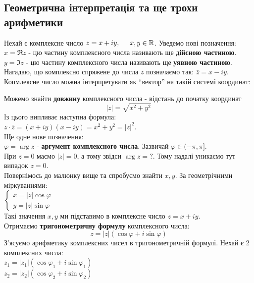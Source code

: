 \documentclass[a4paper, 10pt]{article}
\theoremstyle{theoremdd}
\theoremstyle{theoremdd}
\theoremstyle{theoremdd}
\theoremstyle{theoremdd}
\theoremstyle{theoremdd}
\theoremstyle{theoremdd}
\theoremstyle{theoremdd}
\theoremstyle{theoremdd}
\begin{document}
\subsection{Геометрична інтерпретація та ще трохи арифметики}
Нехай є комплексне число $z = x + iy, \hspace{0.5cm} x,y \in \mathbb{R}$. Уведемо нові позначення:\\
$x = \Re z$ - цю частину комплексного числа називають ще \textbf{дійсною частиною}. \\
$y = \Im z$ - цю частину комплексного числа називають ще \textbf{уявною частиною}.\\
Нагадаю, що комплексно спряжене до числа $z$ позначаємо так: $\bar{z} = x - iy$.
\bigskip \\
Копмлексне число можна інтерпретувати як \enquote{вектор} на такій системі координат:
\begin{figure}[H]
\centering
{}
\end{figure}
Можемо знайти \textbf{довжину} комплексного числа - відстань до початку координат
$$|z| = \sqrt{x^2+y^2}$$
Із цього випливає наступна формула:\\
$z \cdot \bar{z} = (x+iy)(x-iy) = x^2+y^2 = |z|^2$.
\bigskip \\
Ще одне нове позначення:\\
$\varphi = \arg z$ - \textbf{аргумент комплексного числа}. Зазвичай $\varphi \in (-\pi,\pi]$.
\bigskip \\
При $z = 0$ маємо $|z| = 0$, а тому звідси $\arg z = ?$. Тому надалі уникаємо тут випадок $z = 0$.
\bigskip \\
Повернімось до малюнку вище та спробуємо знайти $x,y$. За геометрічними міркуваннями:\\
$\begin{cases}
x = |z| \cos \varphi \\
y = |z| \sin \varphi
\end{cases}
$\\
Такі значення $x,y$ ми підставимо в комплексне число $z = x + iy$.\\ Отримаємо \textbf{тригонометричну формулу} комплексного числа:
$$z = |z|(\cos \varphi + i \sin \varphi)$$
З'ясуємо арифметику комплексних чисел в тригонометричній формулі. Нехай є 2 комплексних числа:\\
$z_1 = |z_1| (\cos \varphi_1 + i \sin \varphi_1)$\\
$z_2 = |z_2| (\cos \varphi_2 + i \sin \varphi_2)$
\end{document}
